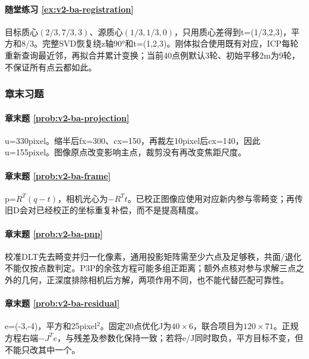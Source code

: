 \paragraph*{随堂练习 \ref{ex:v2-ba-registration}}
\begin{solution}
目标质心$(2/3,7/3,3)$、源质心$(1/3,1/3,0)$，只用质心差得到t=(1/3,2,3)，平方和8/3。完整SVD恢复绕z轴90°和t=(1,2,3)。刚体拟合使用既有对应，ICP每轮重新查询最近邻，再拟合并累计变换；当前40点例默认3轮、初始平移2m为9轮，不保证所有点云都如此。
\end{solution}

\subsubsection*{章末习题}

\paragraph*{章末题 \ref{prob:v2-ba-projection}}
\begin{solution}
u=330pixel。缩半后fx=300、cx=150，再裁左10pixel后cx=140，因此u=155pixel。图像原点改变影响主点，裁剪没有再改变焦距尺度。
\end{solution}

\paragraph*{章末题 \ref{prob:v2-ba-frame}}
\begin{solution}
p=$R^T(q-t)$，相机光心为$-R^Tt$。已校正图像应使用对应新内参与零畸变；再传旧D会对已经校正的坐标重复补偿，而不是提高精度。
\end{solution}

\paragraph*{章末题 \ref{prob:v2-ba-pnp}}
\begin{solution}
校准DLT先去畸变并归一化像素，通用投影矩阵需至少六点及足够秩，共面/退化不能仅按点数判定。P3P的余弦方程可能多组正距离；额外点核对参与求解三点之外的几何，正深度排除相机后方解，两项作用不同，也不能代替匹配可靠性。
\end{solution}

\paragraph*{章末题 \ref{prob:v2-ba-residual}}
\begin{solution}
e=(-3,-4)，平方和25pixel$^2$。固定20点优化J为$40\times6$，联合项目为$120\times71$。正规方程右端$-J^Te$，与残差及参数化保持一致；若将e/J同时取负，平方目标不变，但不能只改其中一个。
\end{solution}

